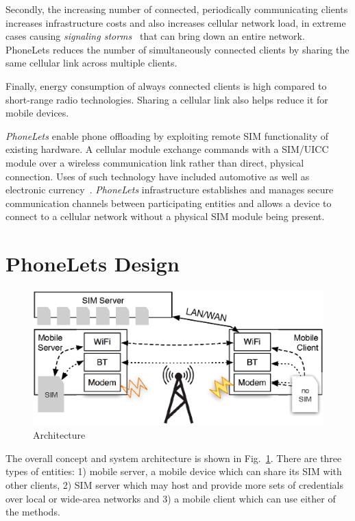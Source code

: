 \documentclass{sig-alternate-10pt}
\begin{document}
Secondly, the increasing number of connected, periodically communicating clients increases infrastructure costs and also increases cellular network load, in extreme cases causing \emph{signaling storms}~\cite{Yang:wh} that can bring down an entire network. PhoneLets reduces the number of simultaneously connected clients by sharing the same cellular link across multiple clients.

Finally, energy consumption of always connected clients is high compared to short-range radio technologies. Sharing a cellular link also helps reduce it for mobile devices.

\emph{PhoneLets} enable phone offloading by exploiting remote SIM functionality of existing hardware. A cellular module exchange commands with a SIM/UICC module over a wireless communication link rather than direct, physical connection. Uses of such technology have included automotive as well as electronic currency~\cite{subramanian2003sim}. \emph{PhoneLets} infrastructure establishes and manages secure communication channels between participating entities and allows a device to connect to a cellular network without a physical SIM module being present.


\section{PhoneLets Design}

\begin{figure}
\centering
\includegraphics[width=0.9\columnwidth]{figs/arch}
\vspace{-3mm}
\caption{Architecture}
\label{fig:arch}
\vspace{-2mm}
\end{figure}

The overall concept and system architecture is shown in Fig.~\ref{fig:arch}. There are three types of entities: 1) mobile server, a mobile device which can share its SIM with other clients, 2) SIM server which may host and provide more sets of credentials over local or wide-area networks and 3) a mobile client which can use either of the methods.
\end{document}
